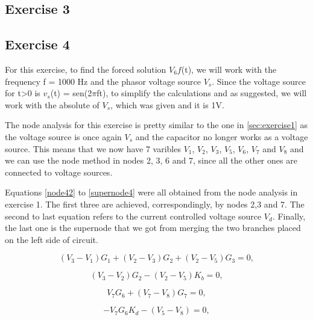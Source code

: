 \subsection{Exercise 3}
\label{sec:exercise3}



\subsection{Exercise 4}
\label{sec:exercise4}


For this exercise, to find the forced solution $V_6f$(t), we will work with the frequency f = 1000 Hz and the phasor voltage source $V_s$. Since the voltage source for t>0 is $v_s$(t) = sen(2$\pi$ft), to simplify the calculations and as suggested, we will work with the absolute of $V_s$, which was given and it is 1V. 

The node analysis for this exercise is pretty similar to the one in \ref{sec:exercise1} as the voltage source is once again $V_s$ and the capacitor no longer works as a voltage source. This means that we now have 7 varibles $V_1$, $V_2$, $V_3$, $V_5$, $V_6$, $V_7$ and $V_8$ and we can use the node method in nodes 2, 3, 6 and 7, since all the other ones are connected to voltage sources.

Equations \ref{node42} to \ref{supernode4} were all obtained from the node analysis in exercise 1. The first three are achieved, correspondingly, by nodes 2,3 and 7. The second to last equation refers to the current controlled voltage source $V_d$. Finally, the last one is the supernode that we got from merging the two branches placed on the left side of circuit.

\begin{equation}
  (V_{3} - V_{1})G_{1} + (V_{2} - V_{3})G_{2} + (V_{2} - V_{5})G_{3}= 0,
  \label{eq:node42}
\end{equation}

\begin{equation}
  (V_{3} - V_{2})G_{2} - (V_{2} - V_{5})K_{b} = 0,
  \label{eq:node43}
\end{equation}


\begin{equation}
  V_{7}G_{6} + (V_{7} - V_{8})G_{7} = 0,
  \label{eq:node47}
\end{equation}


\begin{equation}
  -V_{7}G_{6}K_{d} - (V_{5} - V_{8}) = 0,
  \label{eq:vd4}
\end{equation}


